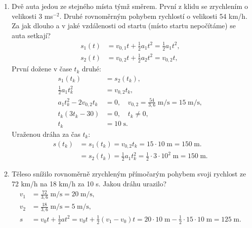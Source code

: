 \documentclass[11pt,a4paper]{article}
\begin{document}
\begin{enumerate}
                \item Dvě auta jedou ze stejného místa týmž směrem. První z klidu se zrychlením o velikosti 3 ms$^{-2}$. Druhé rovnoměrným pohybem rychlostí o velikosti 54 km/h. Za jak dlouho a v jaké vzdálenosti od startu (místo startu nepočítáme) se auta setkají?
                \begin{align*}
                    s_1(t) &= v_{0,1} t + \frac 12 a_1 t^2 = \frac 12 a_1 t^2,
                \\
                    s_2(t) &= v_{0,2} t + \frac 12 a_2 t^2 = v_{0,2} t,
                \end{align*}
                První dožene v čase $t_k$ druhé:
                \begin{align*}
                    s_1(t_k) &= s_2(t_k),
                \\
                    \frac 12 a_1 t_k^2 &= v_{0,2} t_k,
                \\
                    a_1 t_k^2 - 2 v_{0,2} t_k &= 0, \quad v_{0,2} = \frac{54}{3,6} \; \mathrm m / \mathrm s = 15 \; \mathrm m / \mathrm s,
                \\
                    t_k(3 t_k - 30) &= 0, \quad t_k \neq 0,
                \\
                    t_k &= 10 \; \mathrm s.
                \end{align*}
                Uraženou dráha za čas $t_k$:
                \begin{align*}
                    s(t_k) &= s_1(t_k) = v_{0,2} t_k = 15 \cdot 10 \; \mathrm m = 150 \; \mathrm m.
                \\
                    & = s_2(t_k) = \frac 12 a_1 t_k^2 = \frac 12 \cdot 3 \cdot 10^2 \; \mathrm m = 150 \; \mathrm m.
                \end{align*}

                \item Těleso snížilo rovnoměrně zrychleným přímočarým pohybem svoji rychlost ze 72 km/h na 18 km/h za 10 s. Jakou dráhu urazilo?
                \begin{align*}
                    v_1 &= \frac{72}{3,6} \; \mathrm m / \mathrm s = 20 \; \mathrm m / \mathrm s,
                \\
                    v_2 &= \frac{18}{3,6} \; \mathrm m / \mathrm s = 5 \; \mathrm m / \mathrm s,
                \\
                    s &= v_0 t + \frac 12 at^2 = v_0 t + \frac 12 (v_1-v_0) t = 20 \cdot 10 \; \mathrm m - \frac 12 \cdot 15 \cdot 10 \; \mathrm m = 125 \; \mathrm m.
                \end{align*}


\end{enumerate}
\end{document}
